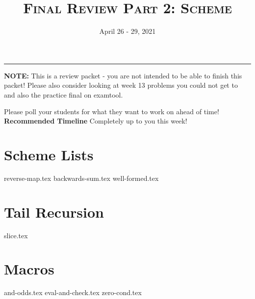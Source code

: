 \documentclass{exam}
\title{\textsc{Final Review Part 2: Scheme}}
\date{April 26 - 29, 2021}
\begin{document}
\maketitle\rule{\textwidth}{0.15em}
\fontsize{12}{15}\selectfont

\begin{blocksection}
\begin{guide}
\textbf{NOTE:} This is a review packet - you are not intended to be able to finish this packet! Please also consider looking at week 13 problems you could not get to and also the practice final on examtool.

Please poll your students for what they want to work on ahead of time!
\textbf{Recommended Timeline}
Completely up to you this week!
\end{guide}
\end{blocksection}

\section{Scheme Lists}
\begin{questions}
{reverse-map.tex}
{backwards-sum.tex}
{well-formed.tex}

\section{Tail Recursion}
{slice.tex}

\section{Macros}
{and-odds.tex}
{eval-and-check.tex}
{zero-cond.tex}

\end{questions}
\end{document}
